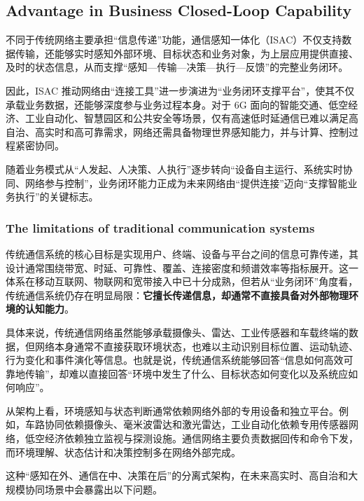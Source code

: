 \subsection{Advantage in Business Closed-Loop Capability}
\label{subsec:ch1-isac-core value-closed loop}

不同于传统网络主要承担“信息传递”功能，通信感知一体化（ISAC）不仅支持数据传输，还能够实时感知外部环境、目标状态和业务对象，为上层应用提供直接、及时的状态信息，从而支撑“感知—传输—决策—执行—反馈”的完整业务闭环\cite{Liu2022ISAC, Zhang2021ISAC6G, ITU2030, IMT2030Framework}。  

因此，ISAC 推动网络由“连接工具”进一步演进为“业务闭环支撑平台”，使其不仅承载业务数据，还能够深度参与业务过程本身。对于 6G 面向的智能交通、低空经济、工业自动化、智慧园区和公共安全等场景，仅有高速低时延通信已难以满足高自治、高实时和高可靠需求，网络还需具备物理世界感知能力，并与计算、控制过程紧密协同\cite{Letaief2019Roadmap, Saad2020Vision6G, ITU2030}。  

随着业务模式从“人发起、人决策、人执行”逐步转向“设备自主运行、系统实时协同、网络参与控制”，业务闭环能力正成为未来网络由“提供连接”迈向“支撑智能业务执行”的关键标志。

\subsubsection{The limitations of traditional communication systems}
\label{subsubsec:ch1-isac-core value-closed loop-communication}

传统通信系统的核心目标是实现用户、终端、设备与平台之间的信息可靠传递，其设计通常围绕带宽、时延、可靠性、覆盖、连接密度和频谱效率等指标展开\cite{Goldsmith2005,Andrews2014, Shafi20175G}。这一体系在移动互联网、物联网和宽带接入中已十分成熟，但若从“业务闭环”角度看，传统通信系统仍存在明显局限：\textbf{它擅长传递信息，却通常不直接具备对外部物理环境的认知能力}。

具体来说，传统通信网络虽然能够承载摄像头、雷达、工业传感器和车载终端的数据，但网络本身通常不直接获取环境状态，也难以主动识别目标位置、运动轨迹、行为变化和事件演化等信息。也就是说，传统通信系统能够回答“信息如何高效可靠地传输”，却难以直接回答“环境中发生了什么、目标状态如何变化以及系统应如何响应”。

从架构上看，环境感知与状态判断通常依赖网络外部的专用设备和独立平台。例如，车路协同依赖摄像头、毫米波雷达和激光雷达，工业自动化依赖专用传感器网络，低空经济依赖独立监视与探测设施。通信网络主要负责数据回传和命令下发，而环境理解、状态估计和决策控制多在网络外部完成。

这种“感知在外、通信在中、决策在后”的分离式架构，在未来高实时、高自治和大规模协同场景中会暴露出以下问题。

